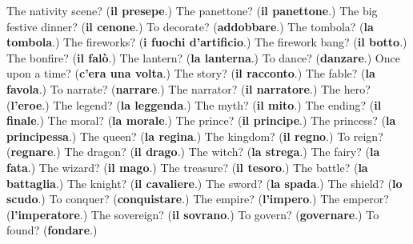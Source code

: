 \begin{tcolorbox}[breakable,colback=teal!4,colframe=teal!35!black,title={Before you move on}]
The nativity scene? (\textbf{il presepe}.) The panettone? (\textbf{il panettone}.) The big festive dinner? (\textbf{il cenone}.) To decorate? (\textbf{addobbare}.) The tombola? (\textbf{la tombola}.) The fireworks? (\textbf{i fuochi d'artificio}.) The firework bang? (\textbf{il botto}.) The bonfire? (\textbf{il falò}.) The lantern? (\textbf{la lanterna}.) To dance? (\textbf{danzare}.) Once upon a time? (\textbf{c'era una volta}.) The story? (\textbf{il racconto}.) The fable? (\textbf{la favola}.) To narrate? (\textbf{narrare}.) The narrator? (\textbf{il narratore}.) The hero? (\textbf{l'eroe}.) The legend? (\textbf{la leggenda}.) The myth? (\textbf{il mito}.) The ending? (\textbf{il finale}.) The moral? (\textbf{la morale}.) The prince? (\textbf{il principe}.) The princess? (\textbf{la principessa}.) The queen? (\textbf{la regina}.) The kingdom? (\textbf{il regno}.) To reign? (\textbf{regnare}.) The dragon? (\textbf{il drago}.) The witch? (\textbf{la strega}.) The fairy? (\textbf{la fata}.) The wizard? (\textbf{il mago}.) The treasure? (\textbf{il tesoro}.) The battle? (\textbf{la battaglia}.) The knight? (\textbf{il cavaliere}.) The sword? (\textbf{la spada}.) The shield? (\textbf{lo scudo}.) To conquer? (\textbf{conquistare}.) The empire? (\textbf{l'impero}.) The emperor? (\textbf{l'imperatore}.) The sovereign? (\textbf{il sovrano}.) To govern? (\textbf{governare}.) To found? (\textbf{fondare}.)
\end{tcolorbox}
